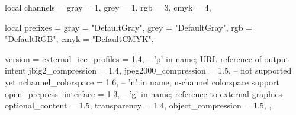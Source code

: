 % 

% 

local channels = {
    gray = 1,
    grey = 1,
    rgb  = 3,
    cmyk = 4,
}

local prefixes = {
    gray = "DefaultGray",
    grey = "DefaultGray",
    rgb  = "DefaultRGB",
    cmyk = "DefaultCMYK",
}

version = {
        external_icc_profiles   = 1.4, -- 'p' in name; URL reference of output intent
        jbig2_compression       = 1.4,
        jpeg2000_compression    = 1.5, -- not supported yet
        nchannel_colorspace     = 1.6, -- 'n' in name; n-channel colorspace support
        open_prepress_interface = 1.3, -- 'g' in name; reference to external graphics
        optional_content        = 1.5,
        transparency            = 1.4,
        object_compression      = 1.5,
    },

